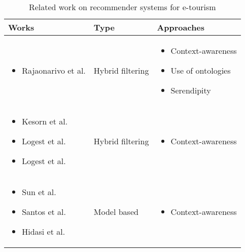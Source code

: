 \begin{table}[h!]
    \centering
    \begin{tabular}{ |>{\centering\arraybackslash}m{3cm}|>{\centering\arraybackslash}m{1cm}|>{\centering\arraybackslash}m{2.7cm}| } 
        \hline
        \textbf{Works} & \textbf{Type} & \textbf{Approaches} \\
        \hline

        \begin{itemize}
            \item Rajaonarivo et al. \cite{rajaonarivo2019rec}
        \end{itemize} &
        
            Hybrid filtering &

            \begin{itemize}
                \item Context-awareness
                \item Use of ontologies
                \item Serendipity
            \end{itemize}
        
        \\ \hline

        \begin{itemize}
            \item Kesorn et al. \cite{kesorn2017personalized}
            \item Logest et al. \cite{logesh2019exploring}
            \item Logest et al. \cite{logesh2018personalised}
        \end{itemize} &

            Hybrid filtering &

            \begin{itemize}
                \item Context-awareness
            \end{itemize}

        \\ \hline

        \begin{itemize}
            \item Sun et al. \cite{sun2019building}
            \item Santos et al. \cite{santos2019using}
            \item Hidasi et al. \cite{hidasi2016general}
        \end{itemize} &
            
            Model based &
        
            \begin{itemize}
                \item Context-awareness
            \end{itemize}

        \\

        \hline
    \end{tabular}
    \caption{Related work on recommender systems for e-tourism}
    \label{table:related-work}
    \end{table}


